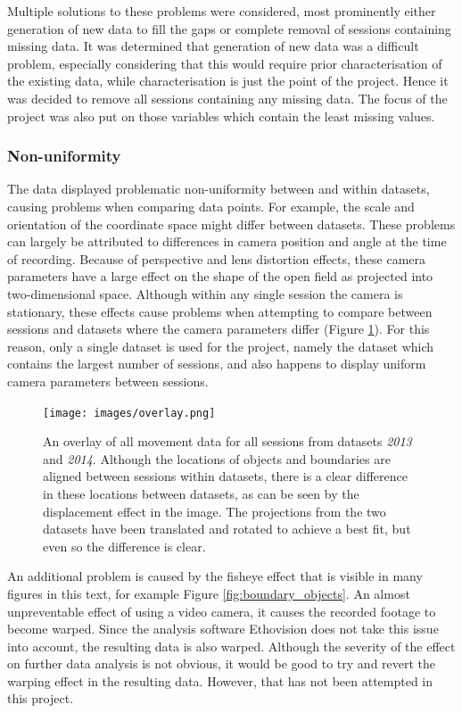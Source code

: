 \documentclass[conference,a4paper,twoside]{IEEEtran}
\begin{document}
Multiple solutions to these problems were considered, most prominently either generation of new data to fill the gaps or complete removal of sessions containing missing data. It was determined that generation of new data was a difficult problem, especially considering that this would require prior characterisation of the existing data, while characterisation is just the point of the project. Hence it was decided to remove all sessions containing any missing data. The focus of the project was also put on those variables which contain the least missing values.

\subsubsection{Non-uniformity}
\label{sec:methods_dataprep_nonuniform}

The data displayed problematic non-uniformity between and within datasets, causing problems when comparing data points. For example, the scale and orientation of the coordinate space might differ between datasets. These problems can largely be attributed to differences in camera position and angle at the time of recording. Because of perspective and lens distortion effects, these camera parameters have a large effect on the shape of the open field as projected into two-dimensional space. Although within any single session the camera is stationary, these effects cause problems when attempting to compare between sessions and datasets where the camera parameters differ (Figure \ref{fig:overlay}). For this reason, only a single dataset is used for the project, namely the dataset which contains the largest number of sessions, and also happens to display uniform camera parameters between sessions.

\begin{figure}
    \centering
    \texttt{[image: images/overlay.png]}
    \caption{An overlay of all movement data for all sessions from datasets \emph{2013} and \emph{2014}. Although the locations of objects and boundaries are aligned between sessions within datasets, there is a clear difference in these locations between datasets, as can be seen by the displacement effect in the image. The projections from the two datasets have been translated and rotated to achieve a best fit, but even so the difference is clear.}
    \label{fig:overlay}
\end{figure}

An additional problem is caused by the fisheye effect that is visible in many figures in this text, for example Figure \ref{fig:boundary_objects}. An almost unpreventable effect of using a video camera, it causes the recorded footage to become warped. Since the analysis software Ethovision does not take this issue into account, the resulting data is also warped. Although the severity of the effect on further data analysis is not obvious, it would be good to try and revert the warping effect in the resulting data. However, that has not been attempted in this project.
\end{document}
